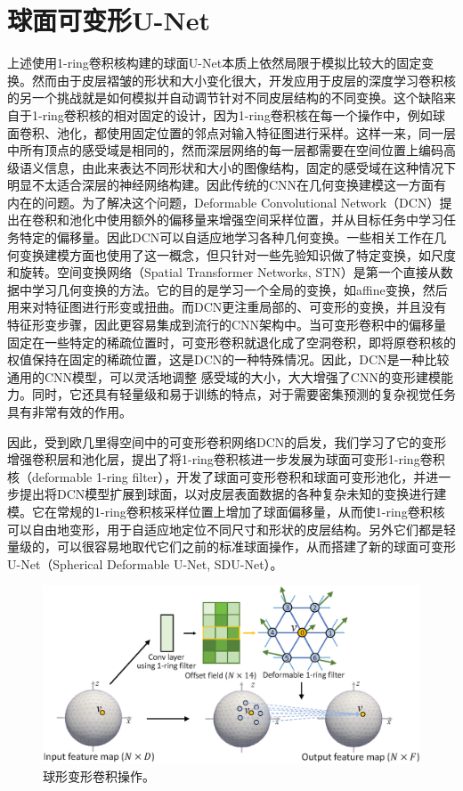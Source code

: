 \section{球面可变形U-Net}
上述使用1-ring卷积核构建的球面U-Net本质上依然局限于模拟比较大的固定变换\cite{dai2017deformable}。然而由于皮层褶皱的形状和大小变化很大，开发应用于皮层的深度学习卷积核的另一个挑战就是如何模拟并自动调节针对不同皮层结构的不同变换。这个缺陷来自于1-ring卷积核的相对固定的设计，因为1-ring卷积核在每一个操作中，例如球面卷积、池化，都使用固定位置的邻点对输入特征图进行采样。这样一来，同一层中所有顶点的感受域是相同的，然而深层网络的每一层都需要在空间位置上编码高级语义信息，由此来表达不同形状和大小的图像结构，固定的感受域在这种情况下明显不太适合深层的神经网络构建。因此传统的CNN在几何变换建模这一方面有内在的问题。为了解决这个问题，Deformable Convolutional Network（DCN）\cite{dai2017deformable}提出在卷积和池化中使用额外的偏移量来增强空间采样位置，并从目标任务中学习任务特定的偏移量。因此DCN可以自适应地学习各种几何变换。一些相关工作在几何变换建模方面也使用了这一概念，但只针对一些先验知识做了特定变换，如尺度\cite{xu2014scale}和旋转\cite{worrall2017harmonic}。空间变换网络（Spatial Transformer Networks, STN）\cite{jaderberg2015spatial}是第一个直接从数据中学习几何变换的方法。它的目的是学习一个全局的变换，如affine变换，然后用来对特征图进行形变或扭曲。而DCN更注重局部的、可变形的变换，并且没有特征形变步骤，因此更容易集成到流行的CNN架构中。当可变形卷积中的偏移量固定在一些特定的稀疏位置时，可变形卷积就退化成了空洞卷积\cite{chen2017rethinking}，即将原卷积核的权值保持在固定的稀疏位置，这是DCN的一种特殊情况。因此，DCN是一种比较通用的CNN模型，可以灵活地调整
感受域的大小，大大增强了CNN的变形建模能力。同时，它还具有轻量级和易于训练的特点，对于需要密集预测的复杂视觉任务具有非常有效的作用\cite{dai2017deformable}。

因此，受到欧几里得空间中的可变形卷积网络DCN\cite{dai2017deformable}的启发，我们学习了它的变形增强卷积层和池化层，提出了将1-ring卷积核进一步发展为球面可变形1-ring卷积核（deformable 1-ring filter），开发了球面可变形卷积和球面可变形池化，并进一步提出将DCN模型扩展到球面，以对皮层表面数据的各种复杂未知的变换进行建模。它在常规的1-ring卷积核采样位置上增加了球面偏移量，从而使1-ring卷积核可以自由地变形，用于自适应地定位不同尺寸和形状的皮层结构。另外它们都是轻量级的，可以很容易地取代它们之前的标准球面操作，从而搭建了新的球面可变形U-Net（Spherical Deformable U-Net, SDU-Net）。

\begin{figure}[t]
	\centering
	\includegraphics[width=0.85\linewidth]{figure/spheircal_deform_conv.eps}
	\caption{球形变形卷积操作。}
	\label{fig:fig_deform_conv}
\end{figure}

